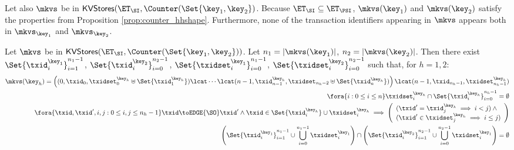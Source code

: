 Let also $\mkvs$ be in $\mathsf{KVStores}(\ET_{\SI}, \Counter(\Set{\key_1, \key_2})$. Because 
$\ET_{\SI} \subseteq \ET_{\PSI}$, $\mkvs(\key_1)$ and $\mkvs(\key_2)$ satisfy the 
properties from Proposition \ref{prop:counter_hhshape}. 
Furthermore, none of the transaction identifiers appearing in $\mkvs$ appears 
both in $\mkvs_{\key_1}$ and $\mkvs_{\key_2}$.
\begin{proposition}
\label{prop:si_counter_hhshape1}
Let $\mkvs$ be in $\mathsf{KVStores}(\ET_{\SI}, \Counter(\Set{\key_1, \key_2}))$. 
Let $n_1 = \lvert \mkvs(\key_1) \rvert$, $n_2 = \lvert \mkvs(\key_2) \rvert$. 
Then there exist $\Set{\txid_{i}^{\key_1}}_{i=1}^{n_1 - 1}$, $\Set{\txid_{i}^{\key_2}}_{i=0}^{n_2 - 1}$, 
$\Set{\txidset_{i}^{\key_1}}_{i=0}^{n_1-1}$, $\Set{\txidset_{i}^{\key_2}}_{i=0}^{n_2 - 1}$ such that, 
for $h = 1,2$: 
\begin{align}
\mkvs(\key_{h}) = \left( (0, \txid_{0}, \txidset^{\key_{h}}_{0} \uplus \Set{\txid^{\key_{h}}_1}) \lcat \cdots \lcat (n-1, \txid^{\key_{h}}_{n-1}, \txidset_{n_{h}-2} \uplus \Set{\txid^{\key_{h}}_{n}}) \right) 
\lcat (n-1, \txid_{n_{h} - 1}, \txidset^{\key_{h}}_{n_{h} - 1}) \label{eq:si_counter_shape}\\
\fora{ i : 0 \leq i \leq n } \txidset^{\key_{h}}_{i} \cap \Set{\txid^{\key_{h}}_{i}}_{i=0}^{n_{h}-1} = \emptyset \label{eq:si_counter_rwtxs}\\
\fora{ \txid, \txid', i,j : 0 \leq i,j \leq n_{h} - 1 } \txid \toEDGE{\SO} \txid' 
\land \txid \in \Set{\txid^{\key_{h}}_{i}} \cup \txidset^{\key_{h}}_{i} \implies 
\left(\begin{array}{l}
(\txid' = \txid^{\key_{h}}_{j} \implies i < j) \land {} \\
(\txid' \in \txidset^{\key_{h}}_{j} \implies i \leq j) \\
\end{array}\right) \label{eq:si_counter_so}\\
\left( \Set{\txid^{\key_{1}}_{i}}_{i=1}^{n_1 -1} \cup \bigcup_{i=0}^{n_1 - 1} \txidset_{i}^{\key_1} \right) \cap 
\left( \Set{\txid^{\key_{2}}_{i}}_{i=1}^{n_2 -1} \cup \bigcup_{i=0}^{n_2 - 1} \txidset_{i}^{\key_1} \right) = \emptyset \label{eq:si_counter_disjoint}
\end{align}

\end{proposition}

